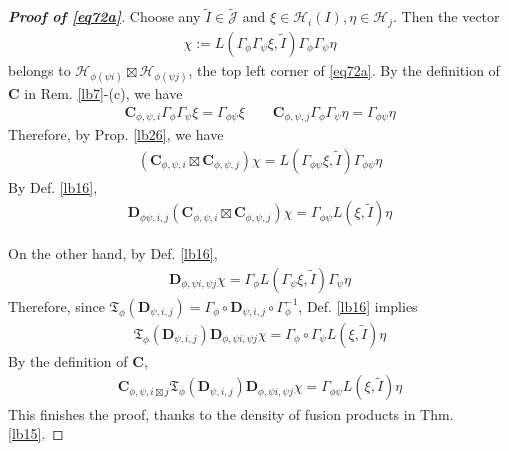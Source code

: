 \documentclass[11pt,b5paper,notitlepage]{article}
\theoremstyle{definition}
\theoremstyle{plain}
\newcommand{\fk}{\mathfrak}
\newcommand{\wtd}{\widetilde}
\newcommand{\Jtd}{\widetilde{\mathcal J}}
\newcommand{\mbf}{\mathbf}
\newcommand{\MH}{\mathcal H}
\numberwithin{equation}{section}
\begin{document}
\begin{appendices}
\begin{proof}[\textbf{Proof of \eqref{eq72a}}]
Choose any $\wtd I\in\Jtd$ and $\xi\in\MH_i(I),\eta\in\MH_j$. Then the vector
\begin{align*}
\chi:=L(\Gamma_\phi\Gamma_\psi\xi,\wtd I)\Gamma_\phi\Gamma_\psi\eta
\end{align*}
belongs to $\MH_{\phi(\psi i)}\boxtimes\MH_{\phi(\psi j)}$, the top left corner of \eqref{eq72a}. By the definition of $\mbf C$ in Rem. \ref{lb7}-(c), we have
\begin{align*}
\mbf C_{\phi,\psi,i}\Gamma_\phi\Gamma_\psi\xi=\Gamma_{\phi\psi}\xi\qquad \mbf C_{\phi,\psi,j}\Gamma_\phi\Gamma_\psi\eta=\Gamma_{\phi\psi}\eta
\end{align*}
Therefore, by Prop. \ref{lb26}, we have
\begin{align*}
(\mbf C_{\phi,\psi,i}\boxtimes\mbf C_{\phi,\psi,j})\chi=L(\Gamma_{\phi\psi}\xi,\wtd I)\Gamma_{\phi\psi}\eta
\end{align*}
By Def. \ref{lb16},
\begin{align*}
\mbf D_{\phi\psi,i,j}(\mbf C_{\phi,\psi,i}\boxtimes\mbf C_{\phi,\psi,j})\chi=\Gamma_{\phi\psi}L(\xi,\wtd I)\eta
\end{align*}

On the other hand, by Def. \ref{lb16},
\begin{align*}
\mbf D_{\phi,\psi i,\psi j}\chi=\Gamma_\phi L(\Gamma_\psi\xi,\wtd I)\Gamma_\psi\eta
\end{align*}
Therefore, since $\fk T_\phi(\mbf D_{\psi,i,j})=\Gamma_\phi\circ\mbf D_{\psi,i,j}\circ\Gamma_\phi^{-1}$, Def. \ref{lb16} implies
\begin{align*}
\fk T_\phi(\mbf D_{\psi,i,j})\mbf D_{\phi,\psi i,\psi j}\chi=\Gamma_\phi\circ\Gamma_\psi L(\xi,\wtd I)\eta
\end{align*}
By the definition of $\mbf C$,
\begin{align*}
\mbf C_{\phi,\psi,i\boxtimes j}\fk T_\phi(\mbf D_{\psi,i,j})\mbf D_{\phi,\psi i,\psi j}\chi=\Gamma_{\phi\psi}L(\xi,\wtd I)\eta
\end{align*}
This finishes the proof, thanks to the density of fusion products in Thm. \ref{lb15}.
\end{proof}




\end{appendices}
\end{document}
